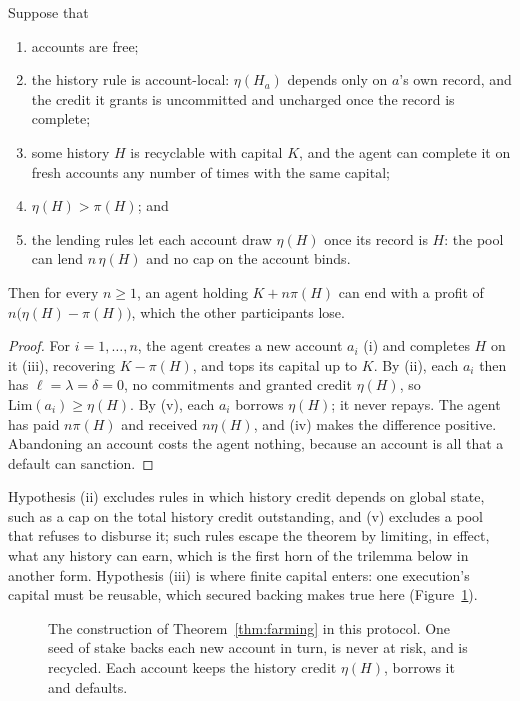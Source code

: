 \documentclass[acmsmall,nonacm,screen]{acmart}
\theoremstyle{acmdefinition}%
\newcommand{\Lim}{\mathrm{Lim}}
\begin{document}
\begin{theorem}[Farming]\label{thm:farming}
Suppose that
\begin{enumerate}
\item[(i)] accounts are free;
\item[(ii)] the history rule is account-local: $\eta(H_a)$ depends only on $a$'s own record, and the
  credit it grants is uncommitted and uncharged once the record is complete;
\item[(iii)] some history $H$ is recyclable with capital $K$, and the agent can complete it on fresh
  accounts any number of times with the same capital;
\item[(iv)] $\eta(H)>\pi(H)$; and
\item[(v)] the lending rules let each account draw $\eta(H)$ once its record is $H$: the pool can lend
  $n\,\eta(H)$ and no cap on the account binds.
\end{enumerate}
Then for every $n\ge1$, an agent holding $K+n\pi(H)$ can end with a profit of
$n\bigl(\eta(H)-\pi(H)\bigr)$, which the other participants lose.
\end{theorem}

\begin{proof}
For $i=1,\dots,n$, the agent creates a new account $a_i$ (i) and completes $H$ on it (iii),
recovering $K-\pi(H)$, and tops its capital up to $K$. By (ii), each $a_i$ then has
$\ell=\lambda=\delta=0$, no commitments and granted credit $\eta(H)$, so $\Lim(a_i)\ge\eta(H)$. By
(v), each $a_i$ borrows $\eta(H)$; it never repays. The agent has paid $n\pi(H)$ and received
$n\eta(H)$, and (iv) makes the difference positive. Abandoning an account costs the agent nothing,
because an account is all that a default can sanction.
\end{proof}

Hypothesis (ii) excludes rules in which history credit depends on global state, such as a cap on
the total history credit outstanding, and (v) excludes a pool that refuses to disburse it; such
rules escape the theorem by limiting, in effect, what any history can earn, which is the first horn
of the trilemma below in another form. Hypothesis (iii) is where finite capital enters: one
execution's capital must be reusable, which secured backing makes true here (Figure~\ref{fig:seed}).

\begin{figure}[t]
  \centering
  
  \caption{The construction of Theorem~\ref{thm:farming} in this protocol. One seed of stake backs
  each new account in turn, is never at risk, and is recycled. Each account keeps the history credit
  $\eta(H)$, borrows it and defaults.}
  \label{fig:seed}
\end{figure}
\end{document}
